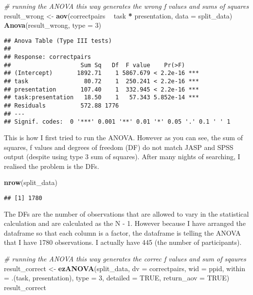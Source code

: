 \documentclass[]{article}
\newenvironment{Shaded}{\begin{snugshade}}{\end{snugshade}}
\newcommand{\KeywordTok}[1]{\textcolor[rgb]{0.13,0.29,0.53}{\textbf{#1}}}
\newcommand{\DataTypeTok}[1]{\textcolor[rgb]{0.13,0.29,0.53}{#1}}
\newcommand{\DecValTok}[1]{\textcolor[rgb]{0.00,0.00,0.81}{#1}}
\newcommand{\StringTok}[1]{\textcolor[rgb]{0.31,0.60,0.02}{#1}}
\newcommand{\CommentTok}[1]{\textcolor[rgb]{0.56,0.35,0.01}{\textit{#1}}}
\newcommand{\OtherTok}[1]{\textcolor[rgb]{0.56,0.35,0.01}{#1}}
\newcommand{\OperatorTok}[1]{\textcolor[rgb]{0.81,0.36,0.00}{\textbf{#1}}}
\newcommand{\NormalTok}[1]{#1}
\begin{document}
\begin{Shaded}
\begin{Highlighting}[]
\CommentTok{# running the ANOVA this way generates the wrong f values and sums of squares}
\NormalTok{result_wrong <-}\StringTok{ }\KeywordTok{aov}\NormalTok{(correctpairs }\OperatorTok{~}\StringTok{ }\NormalTok{task }\OperatorTok{*}\StringTok{ }\NormalTok{presentation, }\DataTypeTok{data =}\NormalTok{ split_data)}
\KeywordTok{Anova}\NormalTok{(result_wrong, }\DataTypeTok{type =} \DecValTok{3}\NormalTok{)}
\end{Highlighting}
\end{Shaded}

\begin{verbatim}
## Anova Table (Type III tests)
## 
## Response: correctpairs
##                    Sum Sq   Df  F value    Pr(>F)    
## (Intercept)       1892.71    1 5867.679 < 2.2e-16 ***
## task                80.72    1  250.241 < 2.2e-16 ***
## presentation       107.40    1  332.945 < 2.2e-16 ***
## task:presentation   18.50    1   57.343 5.852e-14 ***
## Residuals          572.88 1776                       
## ---
## Signif. codes:  0 '***' 0.001 '**' 0.01 '*' 0.05 '.' 0.1 ' ' 1
\end{verbatim}

This is how I first tried to run the ANOVA. However as you can see, the
sum of squares, f values and degrees of freedom (DF) do not match JASP
and SPSS output (despite using type 3 sum of squares). After many nights
of searching, I realised the problem is the DFs.

\begin{Shaded}
\begin{Highlighting}[]
\KeywordTok{nrow}\NormalTok{(split_data)}
\end{Highlighting}
\end{Shaded}

\begin{verbatim}
## [1] 1780
\end{verbatim}

The DFs are the number of observations that are allowed to vary in the
statistical calculation and are calculated as the N - 1. However because
I have arranged the dataframe so that each column is a factor, the
dataframe is telling the ANOVA that I have 1780 observations. I actually
have 445 (the number of participants).

\begin{Shaded}
\begin{Highlighting}[]
\CommentTok{# running the ANOVA this way generates the correc f values and sum of sqaures}
\NormalTok{result_correct <-}\StringTok{ }\KeywordTok{ezANOVA}\NormalTok{(split_data, }\DataTypeTok{dv =}\NormalTok{ correctpairs, }\DataTypeTok{wid =}\NormalTok{ ppid, }\DataTypeTok{within =}\NormalTok{ .(task, presentation), }\DataTypeTok{type =} \DecValTok{3}\NormalTok{, }\DataTypeTok{detailed =} \OtherTok{TRUE}\NormalTok{, }\DataTypeTok{return_aov =} \OtherTok{TRUE}\NormalTok{)}
\NormalTok{result_correct}
\end{Highlighting}
\end{Shaded}
\end{document}
